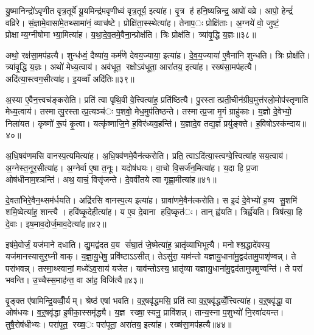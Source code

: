 यु॒ष्मानिन्द्रो॑ऽवृणीत वृत्र॒तूर्ये॑ यू॒यमिन्द्र॑मवृणीध्वं वृत्र॒तूर्य॒ इत्या॑ह। वृ॒त्र ह॑ हनि॒ष्यन्निन्द्र॒ आपो॑ वव्रे। आपो॒ हेन्द्रं॑ वव्रिरे। सं॒ज्ञामे॒वासा॑मे॒तथ्सामा॑नं॒ व्याच॑ष्टे। प्रोक्षि॑ता॒स्स्थेत्या॑ह। तेनाप॒ः प्रोक्षि॑ताः। अ॒ग्नये॑ वो॒ जुष्टं॒ प्रोक्षाम्य॒ग्नीषोमाभ्या॒मित्या॑ह। य॒था॒दे॒व॒तमे॒वैना॒न्प्रोक्ष॑ति। त्रिः प्रोक्ष॑ति। त्र्या॑वृ॒द्धि य॒ज्ञः॥३८॥

अथो॒ रक्ष॑सा॒मप॑हत्यै। शुन्ध॑ध्वं॒ दैव्या॑य॒ कर्म॑णे देवय॒ज्याया॒ इत्या॑ह। दे॒व॒य॒ज्याया॑ ए॒वैना॑नि शुन्धति। त्रिः प्रोक्ष॑ति। त्र्या॑वृ॒द्धि य॒ज्ञः। अथो॑ मेध्य॒त्वाय॑। अव॑धूत॒ रक्षोऽव॑धूता॒ आरा॑तय॒ इत्या॑ह। रख्ष॑सा॒मप॑हत्यै। अदि॑त्या॒स्त्वग॒सीत्या॑ह। इ॒यव्वाँ अदि॑तिः॥३९॥

अ॒स्या ए॒वैन॒त्त्वच॑ङ्करोति। प्रति॑ त्वा पृथि॒वी वे॒त्त्वित्या॑ह॒ प्रति॑ष्ठित्यै। पु॒रस्तात्प्रती॒चीन॑ग्रीव॒मुत्त॑रलो॒मोप॑स्तृणाति मेध्य॒त्वाय॑। तस्मात्पु॒रस्तात्प्र॒त्यञ्च॑ः प॒शवो॒ मेध॒मुप॑तिष्ठन्ते। तस्मात्प्र॒जा मृ॒गं ग्राहु॑काः। य॒ज्ञो दे॒वेभ्यो॒ निला॑यत। कृष्णो॑ रू॒पं कृ॒त्वा। यत्कृ॑ष्णाजि॒ने ह॒विर॑ध्यव॒हन्ति॑। य॒ज्ञादे॒व तद्य॒ज्ञं प्रयु॑ङ्क्ते। ह॒विषोऽस्क॑न्दाय॥४०॥

अ॒धि॒षव॑णमसि वानस्प॒त्यमित्या॑ह। अ॒धि॒षव॑णमे॒वैन॑त्करोति। प्रति॒ त्वाऽदि॑त्या॒स्त्वग्वे॒त्त्वित्या॑ह सय॒त्वाय॑। अ॒ग्नेस्त॒नूर॒सीत्या॑ह। अ॒ग्नेर्वा ए॒षा त॒नूः। यदोष॑धयः। वा॒चो वि॒सर्ज॑न॒मित्या॑ह। य॒दा हि प्र॒जा ओष॑धीनाम॒श्ञन्ति॑। अथ॒ वाचं॒ विसृ॑जन्ते। दे॒ववी॑तये त्वा गृह्णा॒मीत्या॑ह॥४१॥

दे॒वता॑भिरे॒वैन॒थ्सम॑र्धयति। अद्रि॑रसि वानस्प॒त्य इत्या॑ह। ग्रावा॑णमे॒वैन॑त्करोति। स इ॒दं दे॒वेभ्यो॑ ह॒व्य सु॒शमि॑ शमि॒ष्वेत्या॑ह॒ शान्त्यै। हवि॑ष्कृ॒देहीत्या॑ह। य ए॒व दे॒वाना हवि॒ष्कृत॑ः। तान्‌ ह्व॑यति। त्रिर्ह्व॑यति। त्रिष॑त्या॒ हि दे॒वाः। इष॒माव॒दोर्ज॒माव॒देत्या॑ह॥४२॥

इष॑मे॒वोर्जं॒ यज॑माने दधाति। द्यु॒मद्व॑दत व॒य सं॑घा॒तं जे॒ष्मेत्या॑ह॒ भ्रातृ॑व्याभिभूत्यै। मनोश्श्र॒द्धादे॑वस्य॒ यज॑मानस्यासुर॒घ्नी वाक्। य॒ज्ञा॒यु॒धेषु॒ प्रवि॑ष्टाऽऽसीत्। तेऽसु॑रा॒ याव॑न्तो यज्ञायु॒धाना॑मु॒द्वद॑तामु॒पाशृ॑ण्वन्न्। ते परा॑भवन्न्। तस्मा॒थ्स्वानां॒ मध्ये॑ऽव॒साय॑ यजेत। याव॑न्तोऽस्य॒ भ्रातृ॑व्या यज्ञायु॒धाना॑मु॒द्वद॑तामुपशृ॒ण्वन्ति॑। ते परा॑ भवन्ति। उ॒च्चैस्स॒माह॑न्त॒ वा आ॑ह॒ विजि॑त्यै॥४३॥

वृ॒ङ्क्त ए॑षामिन्द्रि॒यव्वीँ॒र्यम्। श्रेष्ठ॑ एषां भवति। व॒ऱ्॒षवृ॑द्धमसि॒ प्रति॑ त्वा व॒ऱ्॒षवृ॑द्धव्वेँ॒त्त्वित्या॑ह। व॒ऱ्॒षवृ॑द्धा॒ वा ओष॑धयः। व॒ऱ्॒षवृ॑द्धा इ॒षीका॒स्समृ॑द्ध्यै। य॒ज्ञ रख्षा॒स्यनु॒ प्रावि॑शन्न्। तान्य॒स्ना प॒शुभ्यो॑ नि॒रवा॑दयन्त। तुषै॒रोष॑धीभ्यः। परा॑पूत॒ रख्ष॒ः परा॑पूता॒ अरा॑तय॒ इत्या॑ह। रख्ष॑सा॒मप॑हत्यै॥४४॥

